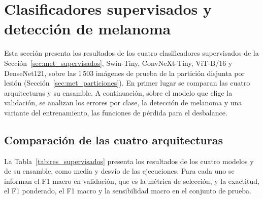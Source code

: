 \section{Clasificadores supervisados y detección de melanoma}
\label{sec:res_supervisados}

Esta sección presenta los resultados de los cuatro clasificadores supervisados de la
Sección~\ref{sec:met_supervisados}, Swin-Tiny, ConvNeXt-Tiny, ViT-B/16 y DenseNet121, sobre las 1\,503 imágenes de
prueba de la partición disjunta por lesión (Sección~\ref{sec:met_particiones}). En primer lugar se comparan las cuatro
arquitecturas y su ensamble. A continuación, sobre el modelo que elige la validación, se analizan los errores por clase,
la detección de melanoma y una variante del entrenamiento, las funciones de pérdida para el desbalance.

\subsection{Comparación de las cuatro arquitecturas}
\label{sec:res_sup_arquitecturas}

La Tabla~\ref{tab:res_supervisados} presenta los resultados de los cuatro modelos y de su ensamble, como media y desvío
de las ejecuciones. Para cada uno se informan el F1 macro en validación, que es la métrica de selección, y la exactitud,
el F1 ponderado, el F1 macro y la sensibilidad macro en el conjunto de prueba.


